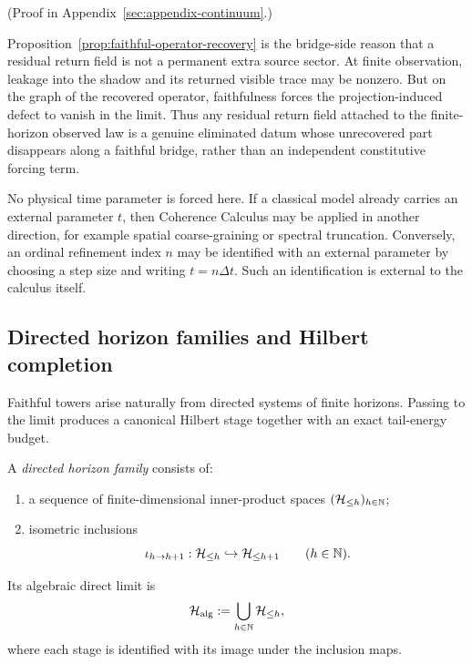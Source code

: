 (Proof in Appendix~\ref{sec:appendix-continuum}.)

\begin{remark}
\label{rem:faithful-limit-returned-residual}
Proposition~\ref{prop:faithful-operator-recovery} is the bridge-side reason
that a residual return field is not a permanent extra source sector. At finite
observation, leakage into the shadow and its returned visible trace may be
nonzero. But on the graph of the recovered operator, faithfulness forces the
projection-induced defect to vanish in the limit. Thus any residual return
field attached to the finite-horizon observed law is a genuine eliminated datum
whose unrecovered part disappears along a faithful bridge, rather than an
independent constitutive forcing term.
\end{remark}

\begin{remark}
\label{rem:external-parameter-optional}
No physical time parameter is forced here. If a classical model already carries
an external parameter $t$, then Coherence Calculus may be applied in another
direction, for example spatial coarse-graining or spectral truncation. Conversely,
an ordinal refinement index $n$ may be identified with an external parameter by
choosing a step size and writing $t=n\Delta t$. Such an identification is
external to the calculus itself.
\end{remark}

\subsection{Directed horizon families and Hilbert completion}

Faithful towers arise naturally from directed systems of finite horizons.
Passing to the limit produces a canonical Hilbert stage together with an exact
tail-energy budget.

\begin{definition}
\label{def:directed-horizon-family}
A \emph{directed horizon family} consists of:
\begin{enumerate}[label=(\roman*), leftmargin=2em, itemsep=0.2em]
\item a sequence of finite-dimensional inner-product spaces
      $(\mathcal{H}_{\le h})_{h\in\mathbb{N}}$;
\item isometric inclusions
      \[
      \iota_{h\to h+1}:\mathcal{H}_{\le h}\hookrightarrow \mathcal{H}_{\le h+1}
      \qquad(h\in\mathbb{N}).
      \]
\end{enumerate}
Its algebraic direct limit is
\[
\mathcal{H}_{\mathrm{alg}}:=\bigcup_{h\in\mathbb{N}}\mathcal{H}_{\le h},
\]
where each stage is identified with its image under the inclusion maps.
\end{definition}

